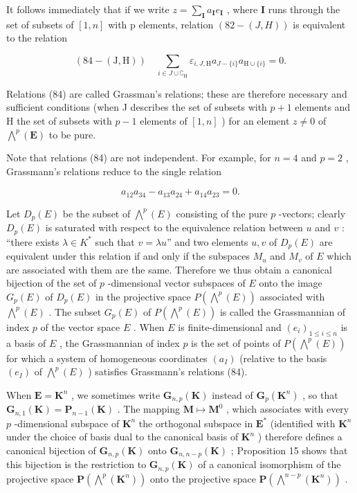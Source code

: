 It follows immediately that if we write \(z = \sum_{\mathbf{I}} a_{\mathbf{I}} e_{\mathbf{I}}\) , where \(\mathbf{I}\) runs through the set of subsets of \([1, n]\) with p elements, relation \((82-(J, H))\) is equivalent to the relation

\[
(84 - (\mathrm{J}, \mathrm{H})) \quad \sum_ {i \in J \cup \complement_ {\mathrm{H}}} \varepsilon_ {i, J, \mathrm{H}} a _ {J - \{i \}} a _ {\mathrm{H} \cup \{i \}} = 0.
\]

Relations (84) are called Grassman's relations; these are therefore necessary and sufficient conditions (when J describes the set of subsets with \(p + 1\) elements and H the set of subsets with \(p - 1\) elements of \([1, n]\) ) for an element \(z \neq 0\) of \(\bigwedge^{p}(\mathbf{E})\) to be pure.

Note that relations (84) are not independent. For example, for \(n = 4\) and \(p = 2\) , Grassmann's relations reduce to the single relation

\[
a _ {1 2} a _ {3 4} - a _ {1 3} a _ {2 4} + a _ {1 4} a _ {2 3} = 0.\tag{85}
\]

Let \(D_p(E)\) be the subset of \(\bigwedge^p(E)\) consisting of the pure \(p\) -vectors; clearly \(D_p(E)\) is saturated with respect to the equivalence relation between \(u\) and \(v\) : ``there exists \(\lambda \in K^*\) such that \(v = \lambda u\)'' and two elements \(u, v\) of \(D_p(E)\) are equivalent under this relation if and only if the subspaces \(M_u\) and \(M_v\) of \(E\) which are associated with them are the same. Therefore we thus obtain a canonical bijection of the set of \(p\) -dimensional vector subspaces of \(E\) onto the image \(G_p(E)\) of \(D_p(E)\) in the projective space \(P(\bigwedge^p(E))\) associated with \(\bigwedge^p(E)\) . The subset \(G_p(E)\) of \(P(\bigwedge^p(E))\) is called the Grassmannian of index \(p\) of the vector space \(E\) . When \(E\) is finite-dimensional and \((e_i)_{1 \leq i \leq n}\) is a basis of \(E\) , the Grassmannian of index \(p\) is the set of points of \(P(\bigwedge^p(E))\) for which a system of homogeneous coordinates \((a_I)\) (relative to the basis \((e_I)\) of \(\bigwedge^p(E)\) ) satisfies Grassmann's relations (84).

When \(\mathbf{E} = \mathbf{K}^n\) , we sometimes write \(\mathbf{G}_{n,p}(\mathbf{K})\) instead of \(\mathbf{G}_p(\mathbf{K}^n)\) , so that \(\mathbf{G}_{n,1}(\mathbf{K}) = \mathbf{P}_{n-1}(\mathbf{K})\) . The mapping \(\mathbf{M} \mapsto \mathbf{M}^0\) , which associates with every \(p\) -dimensional subspace of \(\mathbf{K}^n\) the orthogonal subspace in \(\mathbf{E}^*\) (identified with \(\mathbf{K}^n\) under the choice of basis dual to the canonical basis of \(\mathbf{K}^n\) ) therefore defines a canonical bijection of \(\mathbf{G}_{n,p}(\mathbf{K})\) onto \(\mathbf{G}_{n,n-p}(\mathbf{K})\) ; Proposition 15 shows that this bijection is the restriction to \(\mathbf{G}_{n,p}(\mathbf{K})\) of a canonical isomorphism of the projective space \(\mathbf{P}(\bigwedge^p (\mathbf{K}^n))\) onto the projective space \(\mathbf{P}(\bigwedge^{n-p}(\mathbf{K}^n))\) .

